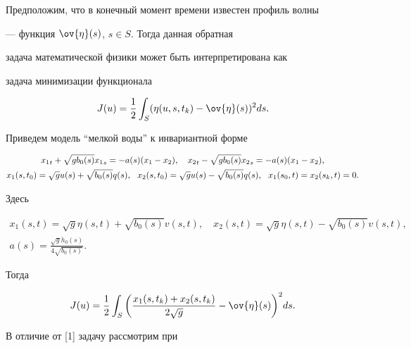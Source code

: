 Предположим, что в конечный момент времени известен профиль волны


--- функция $\ov{\eta}(s)$, $s \in S$.  Тогда данная обратная


задача математической физики может быть интерпретирована как


задача минимизации функционала


$$


J(u)=\frac{1}{2} \int_S (\eta(u,s,t_k)-\ov{\eta}(s))^2 ds.


$$





Приведем модель ``мелкой воды'' к инвариантной форме


\begin{gather}


{x_1}_t +\sqrt{gb_0(s)} {x_1}_s = - a(s) (x_1-x_2), \quad {x_2}_t -


\sqrt{gb_0(s)} {x_2}_s = - a(s) (x_1-x_2),\\


x_1(s,t_0) = \sqrt{g}u(s) + \sqrt{b_0(s)}q(s), \ \


x_2(s,t_0) = \sqrt{g}u(s) - \sqrt{b_0(s)}q(s), \ \ x_1(s_0,t) =


x_2(s_k,t) = 0.\notag


\end{gather}


Здесь


\begin{gather*}


x_1(s,t) = \sqrt{g}\eta(s,t) + \sqrt{b_0(s)}v(s,t), \quad


x_2(s,t) = \sqrt{g}\eta(s,t) - \sqrt{b_0(s)}v(s,t),\\


a(s) = \frac{\sqrt{g} \dot{h}_0(s)}{4\sqrt{b_0(s)}}.


\end{gather*}


Тогда


\begin{equation}


J(u) = \frac{1}{2} \int_S \bigg(\frac{x_1(s,t_k) +


x_2(s,t_k)}{2\sqrt{g}} - \ov{\eta}(s)\bigg)^2 ds.


\end{equation}





В отличие от [1] задачу рассмотрим при


